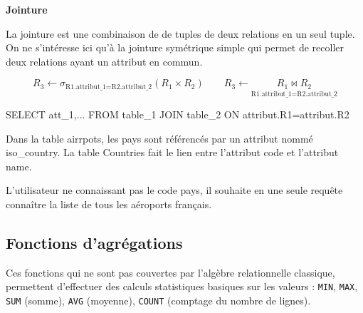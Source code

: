 \documentclass[10pt]{article}
\newif\ifprofvar
\begin{document}
\begin{defi}

\textbf{Jointure}

La jointure est une combinaison de de tuples de deux relations en un seul tuple. On ne s'intéresse ici qu'à la jointure symétrique simple qui permet de recoller deux relations ayant un attribut en commun. 

$$ 
R_3 \leftarrow \sigma_{\text{R1.attribut\_1=R2.attribut\_2}} (R_1\times R_2) \quad \quad 
R_3 \leftarrow \underset{\text{R1.attribut\_1=R2.attribut\_2}}{R_1 \bowtie R_2}
$$

\begin{envsql}
\begin{sql}
SELECT att_1,... FROM table_1 JOIN table_2 ON attribut.R1=attribut.R2
\end{sql}
\end{envsql}

\end{defi}

\begin{exemple}
Dans la table airrpots, les pays sont référencés par un attribut nommé iso\_country. La table Countries fait le lien entre l'attribut code et l'attribut name. 

L'utilisateur ne connaissant pas le code pays, il souhaite en une seule requête connaître la liste de tous les aéroports français. 
\ifprofvar
$$
\pi_{\text{name}}\left( 
\pi_{\text{name,code}}\left(\text{Countries}  \right)
\underset{\text{airports.iso\_country}=\text{Countries.code}}{\bowtie }
\pi_{\text{name,iso\_country}}\left( \text{airports}  \right)
\right)
$$

\begin{envsql}
\begin{sql}
SELECT name FROM 
    (SELECT name, iso_country FROM airports) AS aeroports
    INNER JOIN 
    (SELECT Countries.code from Countries WHERE name="France") AS pays     
        ON aeroports.iso_country=pays.code
\end{sql}
\end{envsql}
\else
\vspace{6cm}
\fi


\end{exemple}

\subsection{Fonctions d'agrégations}
\begin{defi}
Ces fonctions qui ne sont pas couvertes par l’algèbre relationnelle 
classique, permettent d’effectuer des calculs statistiques basiques sur les valeurs : \texttt{MIN}, \texttt{MAX}, \texttt{SUM} 
(somme), \texttt{AVG} (moyenne), \texttt{COUNT} (comptage du nombre de lignes). 

\end{defi}
\end{document}
